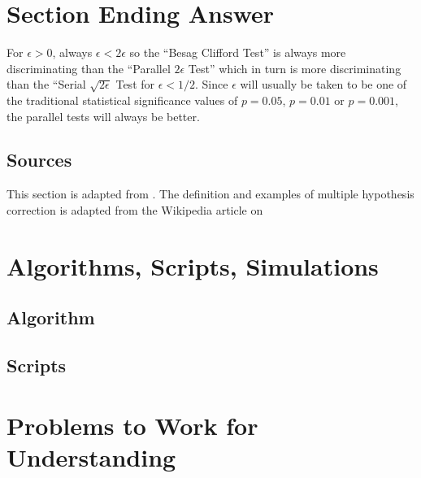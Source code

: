 \documentclass[12pt]{article}
\begin{document}
\section*{Section Ending Answer} For \( \epsilon > 0 \), always \(
\epsilon < 2 \epsilon \) so the ``Besag Clifford Test'' is always more
discriminating than the ``Parallel \( 2 \epsilon \) Test'' which in turn
is more discriminating than the ``Serial \( \sqrt{2 \epsilon} \) Test
for \( \epsilon < 1/2 \).  Since \( \epsilon \) will usually be taken to
be one of the traditional statistical significance values of \( p = 0.05
\), \( p = 0.01 \) or \( p = 0.001 \), the parallel tests will always be
better.

\subsection*{Sources} This section is adapted from
\cite{doi:10.1080/2330443X.2020.1806763}.  The definition and examples
of multiple hypothesis correction is adapted from the Wikipedia article
on 

\hr

\section*{Algorithms, Scripts, Simulations}

\subsection*{Algorithm}

\subsection*{Scripts}


\hr

\section*{Problems to Work for Understanding}
\renewcommand{\theexerciseseries}{}
\renewcommand{\theexercise}{\arabic{exercise}}
\end{document}
